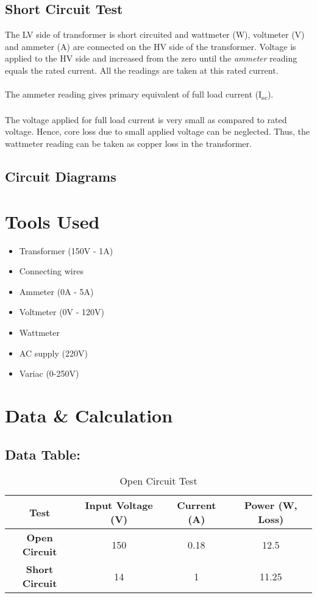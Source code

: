 \documentclass[12pt]{article}
\begin{document}
\subsection{Short Circuit Test}
The LV side of transformer is short circuited and wattmeter (W), voltmeter (V) and ammeter (A) are connected on the HV side of the transformer. Voltage is applied to the HV side and increased from the zero until the \emph{ammeter} reading equals the rated current. All the readings are taken at this rated current.\\\\
The ammeter reading gives primary equivalent of full load current (I\textsubscript{sc}).\\\\
The voltage applied for full load current is very small as compared to rated voltage. Hence, core loss due to small applied voltage can be neglected. Thus, the wattmeter reading can be taken as copper loss in the transformer.\cite{openShort}

\subsection{Circuit Diagrams}


\pagebreak
\section{Tools Used}
\begin{itemize}
    \item Transformer (150V - 1A)
    \item Connecting wires
    \item Ammeter (0A - 5A)
    \item Voltmeter (0V - 120V)
    \item Wattmeter
    \item AC supply (220V)
    \item Variac (0-250V)
\end{itemize}

\section{Data \& Calculation}
\subsection{Data Table:}
\begin{table}[H]
    \centering
    \caption{Open Circuit Test}
    \begin{tabular}{|c|c|c|c|}
        \hline
        Test               & \bf{Input Voltage (V)} & \bf{Current (A)} & \bf{Power (W, Loss)} \\
        \hline
        \bf{Open Circuit}  & 150                    & 0.18             & 12.5                 \\
        \hline
        \bf{Short Circuit} & 14                     & 1                & 11.25                \\
        \hline
    \end{tabular}
\end{table}
\end{document}
